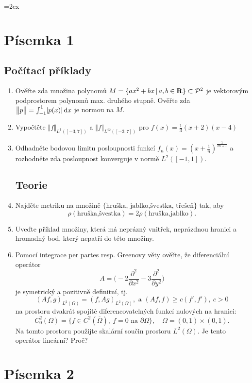 \documentclass[a4paper,10pt]{article}
\def\Real{{\rm\bf R}}
\def\d{\,{\rm d}}               %
\def\abs#1{\lvert#1\rvert}
\def\norm#1{\bigl\Vert#1\bigr\Vert} %
\def\close#1{\overline{#1}}
\def\where{\,|\,}                    %
\def\prtl{\partial}                                        %
\begin{document}
\parskip=2ex
\parindent=0pt
\pagestyle{empty}
\section{Písemka 1}
\subsection{Počítací příklady}
\begin{enumerate}
 \item Ověřte zda množina polynomů $M=\{ax^2+bx\where a,b\in\Real\}\subset \mathcal P^2$ je vektorovým podprostorem 
        polynomů max. druhého stupně. 
       Ověřte zda $\norm{p}=\int_{-1}^{1} \abs{p(x)}\d x$ je normou na $M$.
 \item Vypočtěte $\norm{f}_{L^1([-3,7])}$ a $\norm{f}_{L^\infty([-3,7])}$ pro $f(x)=\frac13(x+2)(x-4)$
 \item Odhadněte bodovou limitu posloupnosti funkcí  $f_n(x)= (x+\frac{1}{n})^{\frac{1}{2n+1}}$ 
  a rozhodněte zda posloupnost konverguje v normě $L^2([-1,1])$.

\pagebreak

\subsection{Teorie}
\item Najděte metriku na množině $\{\text{hruška, jablko,švestka, třešeň}\}$ tak, aby \[\rho(\text{hruška,švestka})=2\rho(\text{hruška,jablko}).\]
\item Uveďte příklad množiny, která má neprázný vnitřek, neprázdnou hranici a hromadný bod, který nepatří do této množiny.
\item Pomocí integrace per partes resp. Greenovy věty ověřte, že diferenciální operátor 
\[
A=\big(-2\frac{\prtl^2}{\prtl x^2} -3\frac{\prtl^2}{\prtl y^2} \big)
\]
je symetrický a pozitivně definitní, tj. 
\[
    (Af,g)_{L^2(\Omega)}=(f,Ag)_{L^2(\Omega)},\text{ a } (Af,f) \ge c(f',f'),\ c>0
\]
na prostoru dvakrát spojitě diferencovatelných funkcí nulových na hranici:
\[
C^2_0(\Omega)=\{ f\in C^2(\close{\Omega}),\ f=0 \text{ na }\prtl\Omega\},\quad \Omega=(0,1)\times(0,1).
\]
Na tomto prostoru použijte skalární součin prostoru $L^2(\Omega)$. Je tento operátor lineární? Proč?
\end{enumerate}

\pagebreak
\section{Písemka 2}
\end{document}
